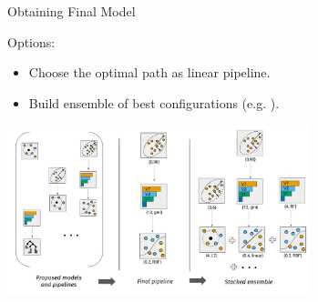 \begin{frame}{Obtaining Final Model}

      Options:
      \begin{itemize}
        \item Choose the optimal path as linear pipeline.
        \item Build ensemble of best configurations (e.g. ).
      \end{itemize}
      \begin{center}
        \includegraphics[width = 0.66\textwidth]{images/stacking.pdf}
      \end{center}
    
\end{frame}







